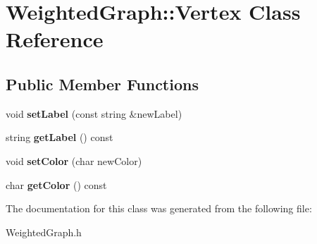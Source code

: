 \hypertarget{class_weighted_graph_1_1_vertex}{\section{Weighted\+Graph\+:\+:Vertex Class Reference}
\label{class_weighted_graph_1_1_vertex}
}
\subsection*{Public Member Functions}
\begin{DoxyCompactItemize}
\item 
\hypertarget{class_weighted_graph_1_1_vertex_afeacbff508350a8d2142369cc0ee09ba}{void {\bfseries set\+Label} (const string \&new\+Label)}\label{class_weighted_graph_1_1_vertex_afeacbff508350a8d2142369cc0ee09ba}

\item 
\hypertarget{class_weighted_graph_1_1_vertex_a09bc4b28b77ed88f70df2438eecb1990}{string {\bfseries get\+Label} () const }\label{class_weighted_graph_1_1_vertex_a09bc4b28b77ed88f70df2438eecb1990}

\item 
\hypertarget{class_weighted_graph_1_1_vertex_ac4fcd685324729f5956640cad824caad}{void {\bfseries set\+Color} (char new\+Color)}\label{class_weighted_graph_1_1_vertex_ac4fcd685324729f5956640cad824caad}

\item 
\hypertarget{class_weighted_graph_1_1_vertex_a4b10c5c1a23bc100385c33b9a40a65eb}{char {\bfseries get\+Color} () const }\label{class_weighted_graph_1_1_vertex_a4b10c5c1a23bc100385c33b9a40a65eb}

\end{DoxyCompactItemize}


The documentation for this class was generated from the following file\+:\begin{DoxyCompactItemize}
\item 
Weighted\+Graph.\+h\end{DoxyCompactItemize}
